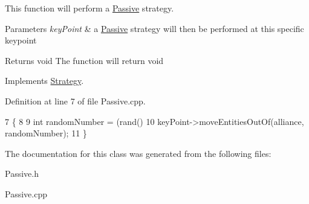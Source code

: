 This function will perform a \hyperlink{classPassive}{Passive} strategy. 


\begin{DoxyParams}{Parameters}
{\em key\+Point} & a \hyperlink{classPassive}{Passive} strategy will then be performed at this specific keypoint\\
\hline
\end{DoxyParams}
\begin{DoxyReturn}{Returns}
void The function will return void 
\end{DoxyReturn}


Implements \hyperlink{classStrategy}{Strategy}.



Definition at line 7 of file Passive.\+cpp.


\begin{DoxyCode}
7                                                                  \{
8     
9     \textcolor{keywordtype}{int} randomNumber = (rand() %
10     keyPoint->moveEntitiesOutOf(alliance, randomNumber);
11 \}
\end{DoxyCode}


The documentation for this class was generated from the following files\+:\begin{DoxyCompactItemize}
\item 
Passive.\+h\item 
Passive.\+cpp\end{DoxyCompactItemize}
